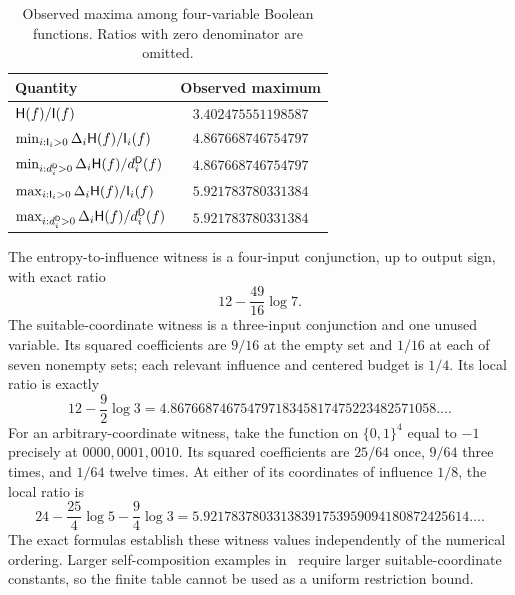 \begin{table}[ht]
\centering
\caption{Observed maxima among four-variable Boolean functions.
Ratios with zero denominator are omitted.}\label{tab:restrictionchecks}
\begin{tabular}{lc}
\toprule
Quantity & Observed maximum\\
\midrule
$\mathsf H(f)/\mathsf I(f)$ & $3.402475551198587$\\
$\min_{i:\mathsf I_i>0}\Delta_i\mathsf H(f)/\mathsf I_i(f)$ & $4.867668746754797$\\
$\min_{i:d_i^{\mathsf D}>0}\Delta_i\mathsf H(f)/d_i^{\mathsf D}(f)$
 & $4.867668746754797$\\
$\max_{i:\mathsf I_i>0}\Delta_i\mathsf H(f)/\mathsf I_i(f)$
 & $5.921783780331384$\\
$\max_{i:d_i^{\mathsf D}>0}\Delta_i\mathsf H(f)/d_i^{\mathsf D}(f)$
 & $5.921783780331384$\\
\bottomrule
\end{tabular}
\end{table}

The entropy-to-influence witness is a four-input conjunction,
up to output sign, with exact ratio
\[
 12-\frac{49}{16}\log 7.
\]
The suitable-coordinate witness is a three-input conjunction
and one unused variable. Its squared coefficients are $9/16$
at the empty set and $1/16$ at each of seven nonempty sets;
each relevant influence and centered budget is $1/4$.
Its local ratio is exactly
\[
 12-\frac92\log 3
 =4.86766874675479718345817475223482571058\ldots .
\]
For an arbitrary-coordinate witness, take the function on
$\{0,1\}^4$ equal to $-1$ precisely at
$0000,0001,0010$. Its squared coefficients are $25/64$ once,
$9/64$ three times, and $1/64$ twelve times. At either of its
coordinates of influence $1/8$, the local ratio is
\[
 24-\frac{25}{4}\log 5-\frac94\log 3
 =5.92178378033138391753959094180872425614\ldots .
\]
The exact formulas establish these witness values independently
of the numerical ordering. Larger self-composition examples
in~\cite{BrainCritical} require larger suitable-coordinate
constants, so the finite table cannot be used as a uniform
restriction bound.
